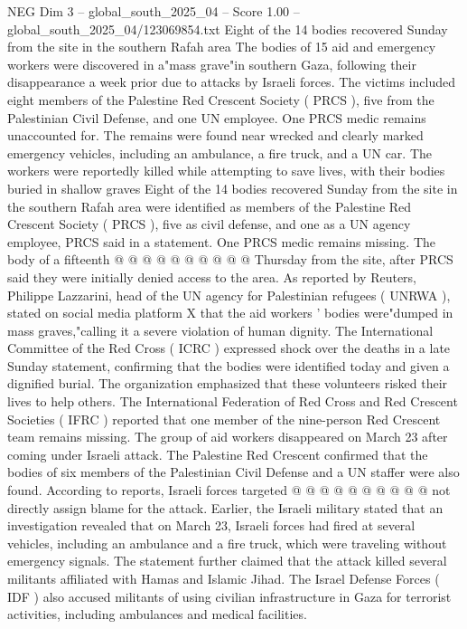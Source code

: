 \begin{textsample}{NEG Dim 3 – global\_south\_2025\_04 – Score 1.00 – global\_south\_2025\_04/123069854.txt}  \label{ex:f3_neg_341}
Eight of the 14 bodies recovered Sunday from the site in the southern Rafah area The bodies of 15 aid and emergency workers were discovered in a"mass grave"in southern Gaza, following their disappearance a week prior due to attacks by Israeli forces.
The victims included eight members of the Palestine Red Crescent Society ( PRCS ), five from the Palestinian Civil Defense, and one UN employee.
One PRCS medic remains unaccounted for.
The remains were found near wrecked and clearly marked emergency vehicles, including an ambulance, a fire truck, and a UN car.
The workers were reportedly killed while attempting to save lives, with their bodies buried in shallow graves Eight of the 14 bodies recovered Sunday from the site in the southern Rafah area were identified as members of the Palestine Red Crescent Society ( PRCS ), five as civil defense, and one as a UN agency employee, PRCS said in a statement.
One PRCS medic remains missing.
The body of a fifteenth @ @ @ @ @ @ @ @ @ @ Thursday from the site, after PRCS said they were initially denied access to the area.
As reported by Reuters, Philippe Lazzarini, head of the UN agency for Palestinian refugees ( UNRWA ), stated on social media platform X that the aid workers ' bodies were"dumped in mass graves,"calling it a severe violation of human dignity.
The International Committee of the Red Cross ( ICRC ) expressed shock over the deaths in a late Sunday statement, confirming that the bodies were identified today and given a dignified burial.
The organization emphasized that these volunteers risked their lives to help others.
The International Federation of Red Cross and Red Crescent Societies ( IFRC ) reported that one member of the nine-person Red Crescent team remains missing.
The group of aid workers disappeared on March 23 after coming under Israeli attack.
The Palestine Red Crescent confirmed that the bodies of six members of the Palestinian Civil Defense and a UN staffer were also found.
According to reports, Israeli forces targeted @ @ @ @ @ @ @ @ @ @ not directly assign blame for the attack.
Earlier, the Israeli military stated that an investigation revealed that on March 23, Israeli forces had fired at several vehicles, including an ambulance and a fire truck, which were traveling without emergency signals.
The statement further claimed that the attack killed several militants affiliated with Hamas and Islamic Jihad.
The Israel Defense Forces ( IDF ) also accused militants of using civilian infrastructure in Gaza for terrorist activities, including ambulances and medical facilities.

\end{textsample}
